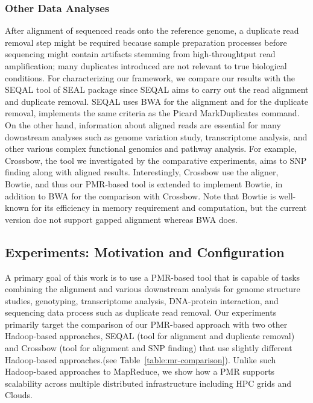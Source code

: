 \documentclass{acm_proc_article-sp}
\begin{document}
\subsubsection{Other Data Analyses}

After alignment of sequenced reads onto the reference genome, a duplicate read removal step might be required because sample preparation processes before sequencing might contain artifacts stemming from high-throughtput read amplification; many duplicates introduced are not relevant to true biological conditions.  For characterizing our framework, we compare our results with the SEQAL tool of SEAL package since SEQAL aims to carry out the read alignment and duplicate removal.  SEQAL uses BWA for the alignment and for the duplicate removal, implements the same criteria as the Picard MarkDuplicates command\cite{seal2011,seal_2011_mapred}.  On the other hand, information about aligned reads are essential for many downstream analyses such as genome variation study, transcriptome analysis, and other various complex functional genomics and pathway analysis.  For example, Crossbow, the tool we investigated by the comparative experiments, aims to SNP finding along with aligned results\cite{langmead2009}.  Interestingly, Crossbow use the aligner, Bowtie, and thus our PMR-based tool is extended to implement Bowtie, in addition to BWA for the comparison with Crossbow.  Note that Bowtie is well-known for its efficiency in memory requirement and computation, but the current version doe not support gapped alignment whereas BWA does.

\subsection{Experiments: Motivation and Configuration}



A primary goal of this work is to use a PMR-based tool that is capable
of tasks combining the alignment and various downstream analysis for
genome structure studies, genotyping, transcriptome analysis,
DNA-protein interaction, and sequencing data process such as duplicate
read removal.  Our experiments primarily target the comparison of our
PMR-based approach with two other Hadoop-based approaches, SEQAL (tool
for alignment and duplicate removal) and Crossbow (tool for alignment
and SNP finding) that use slightly different Hadoop-based
approaches.(see Table~\ref{table:mr-comparison}).  Unlike such
Hadoop-based approaches to MapReduce, we show how a PMR supports
scalability across multiple distributed infrastructure including HPC
grids and Clouds.
\end{document}
